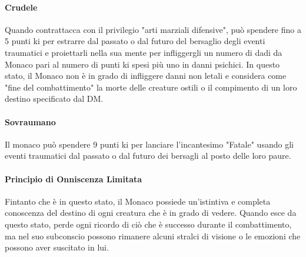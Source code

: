 \documentclass[letterpaper,twocolumn,openany,nodeprecatedcode]{dndbook}
\begin{document}
\paragraph{Crudele} Quando contrattacca con il privilegio "arti marziali difensive", può spendere fino a 5 punti ki per estrarre dal passato o dal futuro del bersaglio degli eventi traumatici e proiettarli nella sua mente per infliggergli un numero di dadi da Monaco pari al numero di punti ki spesi più uno in danni psichici. In questo stato, il Monaco non è in grado di infliggere danni non letali e considera come "fine del combattimento" la morte delle creature ostili o il compimento di un loro destino specificato dal DM.
\paragraph{Sovraumano} Il monaco può spendere 9 punti ki per lanciare l'incantesimo "Fatale" usando gli eventi traumatici dal passato o dal futuro dei bersagli al posto delle loro paure.
\paragraph{Principio di Onniscenza Limitata} Fintanto che è in questo stato, il Monaco possiede un'istintiva e completa conoscenza del destino di ogni creatura che è in grado di vedere. Quando esce da questo stato, perde ogni ricordo di ciò che è successo durante il combattimento, ma nel suo subconscio possono rimanere alcuni stralci di visione o le emozioni che possono aver suscitato in lui.
\end{document}
